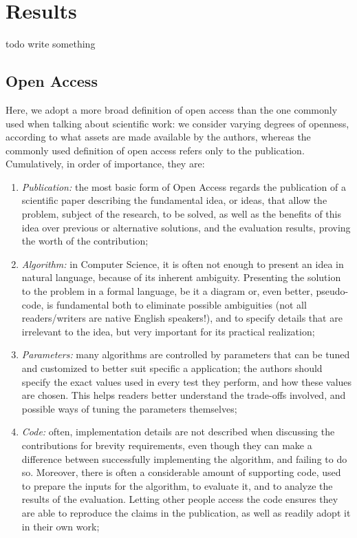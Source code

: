 \documentclass[12pt]{article}
\begin{document}
\section{Results}
\label{sec:org55a4361}
todo write something

\subsection{Open Access}
\label{sec:orgf5b417f}
Here, we adopt a more broad definition of open access than the one commonly used when talking about scientific work: we consider varying degrees of openness, according to what assets are made available by the authors, whereas the commonly used definition of open access refers only to the publication. Cumulatively, in order of importance, they are:

\begin{enumerate}
\item \emph{Publication:} the most basic form of Open Access regards the publication of a scientific paper describing the fundamental idea, or ideas, that allow the problem, subject of the research, to be solved, as well as the benefits of this idea over previous or alternative solutions, and the evaluation results, proving the worth of the contribution;
\item \emph{Algorithm:} in Computer Science, it is often not enough to present an idea in natural language, because of its inherent ambiguity. Presenting the solution to the problem in a formal language, be it a diagram or, even better, pseudo-code, is fundamental both to eliminate possible ambiguities (not all readers/writers are native English speakers!), and to specify details that are irrelevant to the idea, but very important for its practical realization;
\item \emph{Parameters:} many algorithms are controlled by parameters that can be tuned and customized to better suit specific a application; the authors should specify the exact values used in every test they perform, and how these values are chosen. This helps readers better understand the trade-offs involved, and possible ways of tuning the parameters themselves;
\item \emph{Code:} often, implementation details are not described when discussing the contributions for brevity requirements, even though they can make a difference between successfully implementing the algorithm, and failing to do so. Moreover, there is often a considerable amount of supporting code, used to prepare the inputs for the algorithm, to evaluate it, and to analyze the results of the evaluation. Letting other people access the code ensures they are able to reproduce the claims in the publication, as well as readily adopt it in their own work;

\end{enumerate}
\end{document}
